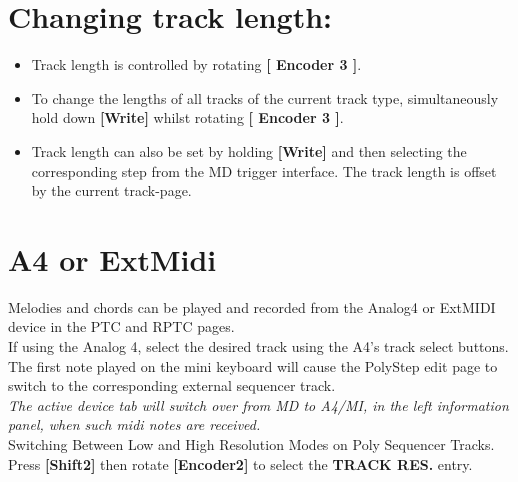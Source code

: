 \vspace{-0.3cm}

\section{Changing track length:}
\begin{itemize}
\item Track length is controlled by rotating \textbf{[ Encoder 3 ]}.
\item To change the lengths of all tracks of the current track type, simultaneously hold down \textbf{[Write]} whilst rotating \textbf{[ Encoder 3 ]}.
\item Track length can also be set by holding \textbf{[Write]} and then selecting the corresponding step from the MD trigger interface. The track length is offset by the current track-page.
\end{itemize}


\section{A4 or ExtMidi}
Melodies and chords can be played and recorded from the Analog4 or ExtMIDI device in the PTC and RPTC pages.
\\

If using the Analog 4, select the desired track using the A4’s track select buttons. The first note played on the mini keyboard will cause the PolyStep edit page to switch to  the corresponding external sequencer track.
\\

\textit{The active device tab will switch over from MD to A4/MI, in the left information panel, when such midi notes are received.}
\\

Switching Between Low and High Resolution Modes on Poly Sequencer Tracks.
Press \textbf{[Shift2]} then rotate \textbf{[Encoder2]} to select the \textbf{TRACK RES.} entry.

